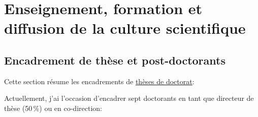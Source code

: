 \documentclass[10pt,french,a4paper,oneside]{article}%
\begin{document}
\section{Enseignement, formation et diffusion de la culture scientifique} %

\subsection{Encadrement de thèse et post-doctorants} %

Cette section résume les encadrements de \href{https://www.theses.fr/074493701}{thèses de doctorat}:

Actuellement, j'ai l'occasion d'encadrer sept doctorants %
en tant que directeur de thèse (50\,\%) ou en co-direction:
\end{document}
